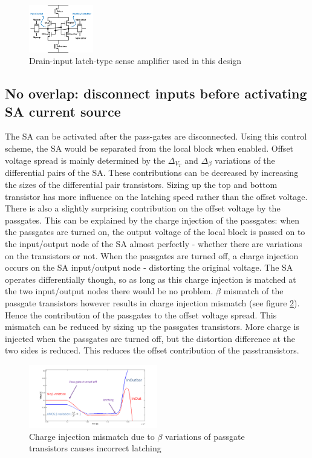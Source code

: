 \documentclass[journal]{IEEEtran}
\begin{document}
\begin{figure}[ht!]
  \centering
  \includegraphics[width=0.25\textwidth]{../fig/hfdstk-sensamp-ourSA2.png}
  \caption{Drain-input latch-type sense amplifier\cite{Cos09} used in this design}
  \label{fig:ourSA}
\end{figure}


\subsection{No overlap: disconnect inputs before activating SA current source}
The SA can be activated after the pass-gates are disconnected. Using this control scheme, the SA would be separated from the local block when enabled. Offset voltage spread is mainly determined by the $\Delta_{V_{T}}$ and $\Delta_{\beta}$ variations of the differential pairs of the SA. These contributions can be decreased by increasing the sizes of the differential pair transistors. Sizing up the top and bottom transistor has more influence on the latching speed rather than the offset voltage. There is also a slightly surprising contribution on the offset voltage by the passgates. This can be explained by the charge injection of the passgates: when the passgates are turned on, the output voltage of the local block is passed on to the input/output node of the SA almost perfectly - whether there are variations on the transistors or not. When the passgates are turned off, a charge injection occurs on the SA input/output node - distorting the original voltage. The SA operates differentially though, so as long as this charge injection is matched at the two input/output nodes there would be no problem. $\beta$ mismatch of the passgate transistors however results in charge injection mismatch (see figure \ref{fig:chargeinjection}). Hence the contribution of the passgates to the offset voltage spread. This mismatch can be reduced by sizing up the passgates transistors. More charge is injected when the passgates are turned off, but the distortion difference at the two sides is reduced. This reduces the offset contribution of the passtransistors.

\begin{figure}[ht!]
  \centering
  \includegraphics[width=0.5\textwidth]{../fig/hfdstk-sensamp-chargeinjectionmismatch.png}
  \caption{Charge injection mismatch due to $\beta$ variations of passgate transistors causes incorrect latching}
  \label{fig:chargeinjection}
\end{figure}
\end{document}
